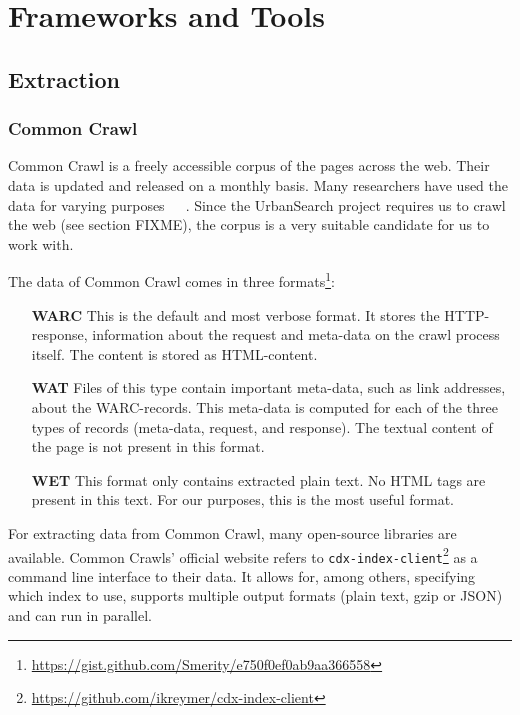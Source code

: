 \section{Frameworks and Tools}

\subsection{Extraction}

\subsubsection{Common Crawl}
Common Crawl \cite{commoncrawl} is a freely accessible corpus of the pages across the web. Their data is updated and released on a monthly basis. Many researchers have used the data for varying purposes~\cite{smith2013dirt}~\cite{muhleisen2012web}~\cite{singh2012wikilinks}. Since the UrbanSearch project requires us to crawl the web (see section {\color{Red} FIXME}), the corpus is a very suitable candidate for us to work with.

The data of Common Crawl comes in three formats\footnote{\url{https://gist.github.com/Smerity/e750f0ef0ab9aa366558}}: 
\begin{itemize}
\item[\textbf{WARC}] This is the default and most verbose format. It stores the HTTP-response, information about the request and meta-data on the crawl process itself. The content is stored as HTML-content.
\item[\textbf{WAT}] Files of this type contain important meta-data, such as link addresses, about the WARC-records. This meta-data is computed for each of the three types of records (meta-data, request, and response). The textual content of the page is not present in this format.
\item[\textbf{WET}] This format only contains extracted plain text. No HTML tags are present in this text. For our purposes, this is the most useful format.
\end{itemize}

For extracting data from Common Crawl, many open-source libraries are available. Common Crawls' official website refers to \texttt{cdx-index-client}\footnote{\url{https://github.com/ikreymer/cdx-index-client}} as a command line interface to their data. It allows for, among others, specifying which index to use, supports multiple output formats (plain text, gzip or JSON) and can run in parallel.

